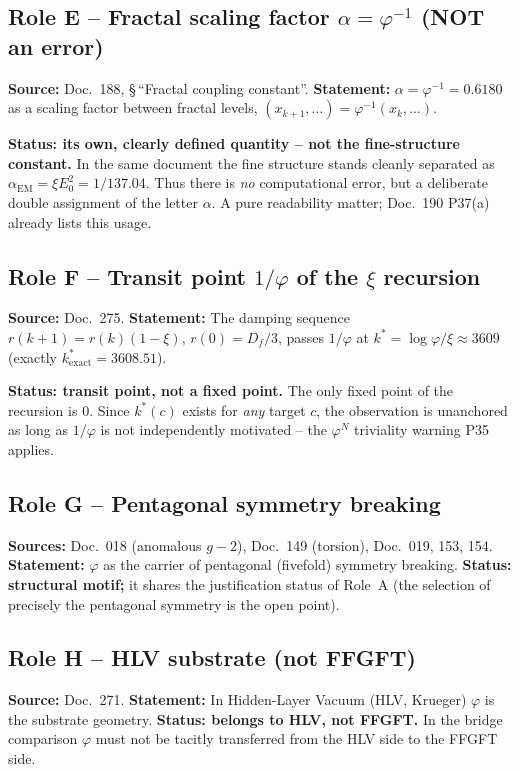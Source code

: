 \subsection{Role E -- Fractal scaling factor $\alpha=\varphi^{-1}$
(NOT an error)}
\textbf{Source:} Doc.~188, \S\,``Fractal coupling constant''.
\textbf{Statement:} $\alpha=\varphi^{-1}=0.6180$ as a scaling factor between
fractal levels, $(x_{k+1},\dots)=\varphi^{-1}(x_k,\dots)$.
\begin{important}
\textbf{Status: its own, clearly defined quantity -- not the fine-structure
constant.} In the same document the fine structure stands cleanly separated as
$\alpha_{\text{EM}}=\xi E_0^2=1/137.04$. Thus there is \emph{no} computational
error, but a deliberate double assignment of the letter $\alpha$. A pure
readability matter; Doc.~190 P37(a) already lists this usage.
\end{important}

\subsection{Role F -- Transit point $1/\varphi$ of the $\xi$ recursion}
\textbf{Source:} Doc.~275. \textbf{Statement:} The damping sequence
$r(k{+}1)=r(k)(1-\xi)$, $r(0)=D_f/3$, passes $1/\varphi$ at
$k^* = \log\varphi/\xi \approx 3609$ (exactly $k^*_{\text{exact}}=3608.51$).
\begin{caution}
\textbf{Status: transit point, not a fixed point.}
The only fixed point of the recursion is $0$. Since $k^*(c)$ exists for
\emph{any} target $c$, the observation is unanchored as long as $1/\varphi$ is
not independently motivated -- the $\varphi^N$ triviality warning P35 applies.
\end{caution}

\subsection{Role G -- Pentagonal symmetry breaking}
\textbf{Sources:} Doc.~018 (anomalous $g{-}2$), Doc.~149 (torsion),
Doc.~019, 153, 154. \textbf{Statement:} $\varphi$ as the carrier of pentagonal
(fivefold) symmetry breaking. \textbf{Status: structural motif;} it shares the
justification status of Role~A (the selection of precisely the pentagonal
symmetry is the open point).

\subsection{Role H -- HLV substrate (not FFGFT)}
\textbf{Source:} Doc.~271. \textbf{Statement:} In Hidden-Layer Vacuum (HLV,
Krueger) $\varphi$ is the substrate geometry. \textbf{Status: belongs to HLV,
not FFGFT.} In the bridge comparison $\varphi$ must not be tacitly transferred
from the HLV side to the FFGFT side.

